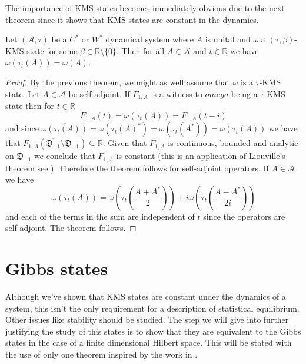 The importance of KMS states becomes immediately obvious due to the next theorem since it shows that KMS states are constant in the dynamics.

\begin{theorem}
Let $(\mathcal{A},\tau)$ be a $C^*$ or $W^*$ dynamical system where $A$ is unital and $\omega$ a $(\tau,\beta)$-KMS state for some $\beta\in\mathbb{R}\setminus\{0\}$. Then for all $A\in\mathcal{A}$ and $t\in\mathbb{R}$ we have $\omega(\tau_t(A))=\omega(A)$.
\end{theorem}

\begin{proof}
By the previous theorem, we might as well assume that $\omega$ is a $\tau$-KMS state. Let $A\in\mathcal{A}$ be self-adjoint. If $F_{1,A}$ is a witness to $omega$ being a $\tau$-KMS state then for $t\in\mathbb{R}$
\begin{equation}
F_{1,A}(t)=\omega(\tau_t(A))=F_{1,A}(t-i)
\end{equation}
and since $\overline{\omega(\tau_t(A))}=\omega(\tau_t(A)^*)=\omega(\tau_t(A^*))=\omega(\tau_t(A))$ we have that $F_{1,A}(\overline{\mathfrak{D}_{-1}}\setminus\mathfrak{D}_{-1})\subseteq\mathbb{R}$. Given that $F_{1,A}$ is continuous, bounded and analytic on $\mathfrak{D}_{-1}$ we conclude that $F_{1,A}$ is constant (this is an application of Liouville's theorem see \cite{Duvenhage1999}). Therefore the theorem follows for self-adjoint operators.
If $A\in\mathcal{A}$ we have
\begin{equation}
\omega(\tau_t(A))=\omega\left(\tau_t\left(\frac{A+A^*}{2}\right)\right)+i\omega\left(\tau_t\left(\frac{A-A^*}{2i}\right)\right)
\end{equation}
and each of the terms in the sum are independent of $t$ since the operators are self-adjoint. The theorem follows.
\end{proof}

\section{Gibbs states}

Although we've shown that KMS states are constant under the dynamics of a system, this isn't the only requirement for a description of statistical equilibrium. Other issues like stability should be studied. The step we will give into further justifying the study of this states is to show that they are equivalent to the Gibbs states in the case of a finite dimensional Hilbert space. This will be stated with the use of only one theorem inspired by the work in \cite{Duvenhage1999}.

